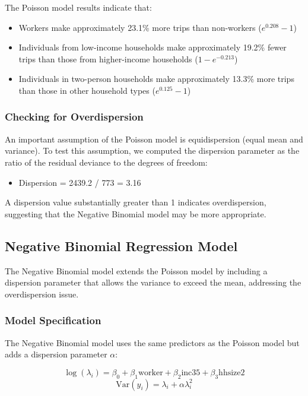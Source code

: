 \documentclass[12pt]{article}
\begin{document}
The Poisson model results indicate that:
\begin{itemize}
    \item Workers make approximately 23.1\% more trips than non-workers ($e^{0.208}-1$)
    \item Individuals from low-income households make approximately 19.2\% fewer trips than those from higher-income households ($1-e^{-0.213}$)
    \item Individuals in two-person households make approximately 13.3\% more trips than those in other household types ($e^{0.125}-1$)
\end{itemize}

\subsubsection{Checking for Overdispersion}

An important assumption of the Poisson model is equidispersion (equal mean and variance). To test this assumption, we computed the dispersion parameter as the ratio of the residual deviance to the degrees of freedom:

\begin{itemize}
    \item Dispersion = 2439.2 / 773 = 3.16
\end{itemize}

A dispersion value substantially greater than 1 indicates overdispersion, suggesting that the Negative Binomial model may be more appropriate.

\subsection{Negative Binomial Regression Model}

The Negative Binomial model extends the Poisson model by including a dispersion parameter that allows the variance to exceed the mean, addressing the overdispersion issue.

\subsubsection{Model Specification}

The Negative Binomial model uses the same predictors as the Poisson model but adds a dispersion parameter $\alpha$:

$$\log(\lambda_i) = \beta_0 + \beta_1 \text{worker} + \beta_2 \text{inc35} + \beta_3 \text{hhsize2}$$
$$\text{Var}(y_i) = \lambda_i + \alpha\lambda_i^2$$
\end{document}
